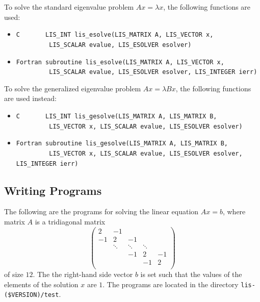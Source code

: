\documentclass[a4paper]{article}
\begin{document}
To solve the standard eigenvalue problem $Ax = \lambda x$, the following functions are used:
\begin{itemize}
\item \verb|C       LIS_INT lis_esolve(LIS_MATRIX A, LIS_VECTOR x,|\\ 
      \verb|         LIS_SCALAR evalue, LIS_ESOLVER esolver)|
\item \verb|Fortran subroutine lis_esolve(LIS_MATRIX A, LIS_VECTOR x,|\\
      \verb|         LIS_SCALAR evalue, LIS_ESOLVER esolver, LIS_INTEGER ierr)|
\end{itemize}
To solve the generalized eigenvalue problem $Ax = \lambda Bx$, the following functions are used instead:
\begin{itemize}
\item \verb|C       LIS_INT lis_gesolve(LIS_MATRIX A, LIS_MATRIX B,|\\ 
      \verb|         LIS_VECTOR x, LIS_SCALAR evalue, LIS_ESOLVER esolver)|
\item \verb|Fortran subroutine lis_gesolve(LIS_MATRIX A, LIS_MATRIX B,|\\
      \verb|         LIS_VECTOR x, LIS_SCALAR evalue, LIS_ESOLVER esolver, LIS_INTEGER ierr)|
\end{itemize}

\subsection{Writing Programs}
\label{sec:testprog3}
The following are the programs for solving the linear equation $Ax = b$,
where matrix $A$ is a tridiagonal matrix 
\[
\left(
\begin{array}{ccccc}
2 & -1 &   &  &   \\
-1 & 2 & -1 &  &   \\
  & \ddots  & \ddots  & \ddots  &   \\
  &   & -1 & 2 & -1 \\
  &   &   & -1 & 2 \\
\end{array}
\right)
\]
of size $12$.
The the right-hand side vector $b$ is set such that the values of the elements of the solution $x$ are $1$. 
The programs are located in the directory \verb|lis-($VERSION)/test|. 
\end{document}
